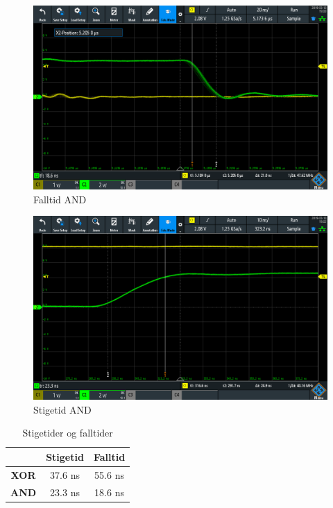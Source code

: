 \begin{figure}
  \centering
  \caption{Falltid AND}
  \includegraphics[width=14cm]{Bilder/Fall_and.png}
\end{figure}

\begin{figure}
  \centering
  \caption{Stigetid AND}
  \includegraphics[width=14cm]{Bilder/Rise_and.png}
\end{figure}


\begin{table}
  \centering
  \caption{Stigetider og falltider}
  \begin{tabular}{c|c c}
     & \textbf{Stigetid} & \textbf{Falltid} \\ \hline
     \textbf{XOR} & 37.6 ns & 55.6 ns \\
     \textbf{AND} & 23.3 ns & 18.6 ns \\
     
  \end{tabular}
\end{table}
